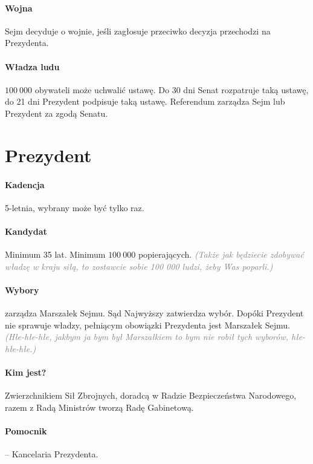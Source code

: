 \documentclass [a4paper, 12pt, oneside]{article}
\newcommand{\comment}[1]{\textcolor{Gray}{\textsf{\emph{(#1)}}}}
\begin{document}
    \paragraph{Wojna} Sejm decyduje o wojnie, jeśli zagłosuje przeciwko decyzja przechodzi na Prezydenta.

    \paragraph{Władza ludu} $100~000$ obywateli może uchwalić ustawę. Do 30 dni Senat rozpatruje taką ustawę, do 21 dni Prezydent podpisuje taką ustawę. Referendum zarządza Sejm lub Prezydent za zgodą Senatu.

\section{Prezydent} %
\label{sec:prezydent}
    \paragraph{Kadencja} 5-letnia, wybrany może być tylko raz.

    \paragraph{Kandydat} Minimum 35 lat. Minimum $100~000$ popierających. \comment{Także jak będziecie zdobywać władzę w kraju siłą, to zostawcie sobie 100 000 ludzi, żeby Was poparli.}

    \paragraph{Wybory} zarządza Marszałek Sejmu. Sąd Najwyższy zatwierdza wybór. Dopóki Prezydent nie sprawuje władzy, pełniącym obowiązki Prezydenta jest Marszałek Sejmu. \comment{Hłe-hłe-hłe, jakbym ja bym był Marszałkiem to bym nie robił tych wyborów, hłe-hłe-hłe.}

    \paragraph{Kim jest?} Zwierzchnikiem Sił Zbrojnych, doradcą w Radzie Bezpieczeństwa Narodowego, razem z Radą Ministrów tworzą Radę Gabinetową.

    \paragraph{Pomocnik} -- Kancelaria Prezydenta.
\end{document}
